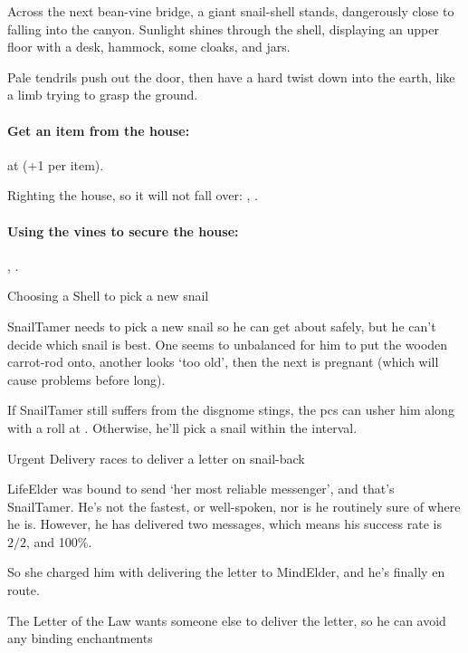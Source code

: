 \begin{multicols}{2}
\begin{speechtext}
  Across the next bean-vine bridge, a giant snail-shell stands, dangerously close to falling into the canyon.
  Sunlight shines through the shell, displaying an upper floor with a desk, hammock, some cloaks, and jars.

  Pale tendrils push out the door, then have a hard twist down into the earth, like a limb trying to grasp the ground.
\end{speechtext}

\paragraph{Get an item from the house:}
 at \tn[12] (+1 per item).

Righting the house, so it will not fall over:
, \tn[12].

\paragraph{Using the vines to secure the house:}
, \tn[10].


{Choosing a Shell}%
{ to pick a new snail}%

\Gls{SnailTamer} needs to pick a new snail so he can get about safely, but he can't decide which snail is best.
One seems to unbalanced for him to put the wooden carrot-rod onto, another looks `too old', then the next is pregnant (which will cause problems before long).

If \gls{SnailTamer} still suffers from the \gls{disgnome} stings,
the \glspl{pc} can usher him along with a  roll at \tn[10].
Otherwise, he'll pick a snail within the \gls{interval}.

{Urgent Delivery}%
{ races to deliver a letter on snail-back}%

\Gls{LifeElder} was bound to send `her most reliable messenger', and that's \gls{SnailTamer}.
He's not the fastest, or well-spoken, nor is he routinely sure of where he is.
However, he has delivered two messages, which means his success rate is $2/2$, and 100\%.

So she charged him with delivering the letter to \gls{MindElder}, and he's finally en route.

{The Letter of the Law}%
{ wants someone else to deliver the letter, so he can avoid any binding enchantments}%


\end{multicols}
